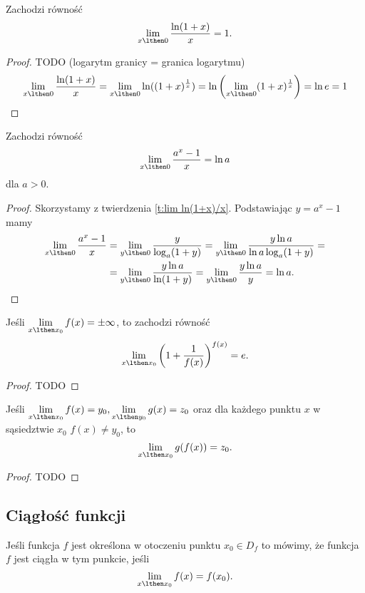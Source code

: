 \begin{theorem}
    \label{t:lim ln(1+x)/x}
    Zachodzi równość
    \[ \lim_{x\lthen 0}\frac{\ln(1 + x)}{x} = 1. \]
\end{theorem}
\begin{proof}
    TODO (logarytm granicy = granica logarytmu)
    \[ \lim_{x\lthen 0}\frac{\ln(1 + x)}{x} = \lim_{x\lthen 0} \ln((1 + x)^{\frac{1}{x}}) = \ln\left(\lim_{x\lthen 0} (1 + x)^{\frac{1}{x}}\right) = \ln e = 1 \]
\end{proof}

\begin{theorem}
    Zachodzi równość
    \[ \lim_{x\lthen 0}\frac{a^x - 1}{x} = \ln a \]
    dla $a > 0$.
\end{theorem}
\begin{proof}
    Skorzystamy z twierdzenia \ref{t:lim ln(1+x)/x}. Podstawiając $y = a^x - 1$ mamy
    \begin{align*} \lim_{x\lthen 0}\frac{a^x - 1}{x} &= \lim_{y\lthen 0}\frac{y}{\log_a(1 + y)} = \lim_{y\lthen 0}\frac{y\ln{a}}{\ln {a}\log_a(1 + y)} = \\
    &= \lim_{y\lthen 0}\frac{y\ln{a}}{\ln(1 + y)} = \lim_{y\lthen 0}\frac{y\ln{a}}{y} = \ln{a}. \end{align*}
\end{proof}

\begin{theorem}
    Jeśli $\lim\limits_{x\lthen x_0} f(x) = \pm\infty$, to zachodzi równość
    \[ \lim_{x\lthen x_0}\left(1 + \frac{1}{f(x)}\right)^{f(x)} = e. \]
\end{theorem}
\begin{proof}
    TODO
\end{proof}

\begin{theorem}
    Jeśli $\lim\limits_{x\lthen x_0} f(x) = y_0, \lim\limits_{x\lthen y_0} g(x) = z_0$ oraz dla każdego punktu $x$ w sąsiedztwie $x_0$ $f(x) \neq y_0$, to
    \[ \lim_{x\lthen x_0} g(f(x)) = z_0. \]
\end{theorem}
\begin{proof}
    TODO
\end{proof}

\subsection{Ciągłość funkcji}
\begin{definition}
    Jeśli funkcja $f$ jest określona w otoczeniu punktu $x_0 \in D_f$ to mówimy, że funkcja $f$ jest ciągła w tym punkcie, jeśli
    \[ \lim_{x \lthen x_0} f(x) = f(x_0). \]
\end{definition}

